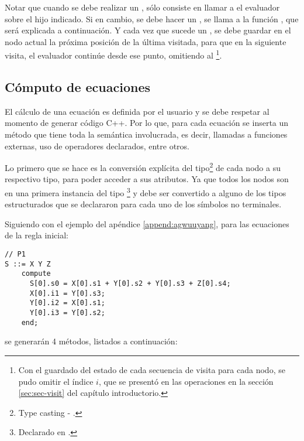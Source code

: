 Notar que cuando se debe realizar un , sólo consiste en llamar a el evaluador sobre el hijo indicado. Si en cambio, se debe hacer un , se llama a la función , que será explicada a continuación. Y cada vez que sucede un , se debe guardar en el nodo actual la próxima posición de la última visitada, para que en la siguiente visita, el evaluador continúe desde ese punto, omitiendo al \footnote{Con el guardado del estado de cada secuencia de visita para cada nodo, se pudo omitir el índice $i$, que se presentó en las operaciones en la sección \ref{sec:sec-visit} del capítulo introductorio.}.

\subsection{Cómputo de ecuaciones}

El cálculo de una ecuación es definida por el usuario y se debe respetar al momento de generar código C++. Por lo que, para cada ecuación se inserta un método que tiene toda la semántica involucrada, es decir, llamadas a funciones externas, uso de operadores declarados, entre otros.

Lo primero que se hace es la conversión explícita del tipo\footnote{Type casting - .} de cada nodo a su respectivo tipo, para poder acceder a sus atributos. Ya que todos los nodos son en una primera instancia del tipo \footnote{Declarado en .} y debe ser convertido a alguno de los tipos estructurados que se declararon para cada uno de los símbolos no terminales.

Siguiendo con el ejemplo del apéndice \ref{append:agwuuyang}, para las ecuaciones de la regla inicial:

\begin{lstlisting}[language=specmag, columns=fullflexible, linewidth=8cm]
// P1
S ::= X Y Z
    compute        
      S[0].s0 = X[0].s1 + Y[0].s2 + Y[0].s3 + Z[0].s4;
      X[0].i1 = Y[0].s3;
      Y[0].i2 = X[0].s1;
      Y[0].i3 = Y[0].s2;
    end;
\end{lstlisting}

se generarán 4 métodos, listados a continuación:

